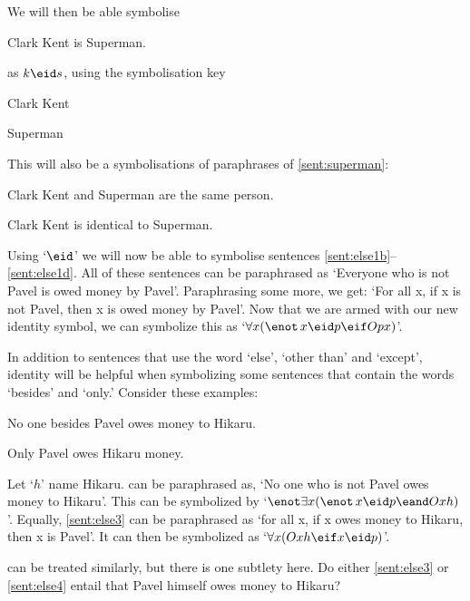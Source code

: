 We will then be able symbolise
\begin{samplesent}
\item\label{sent:superman} Clark Kent is Superman.
\end{samplesent}
as $k\eid s$, using the symbolisation key
\begin{ekey}
\item[k] Clark Kent
\item[s] Superman
\end{ekey}
This will also be a symbolisations of paraphrases of \cref{sent:superman}:
\begin{samplesent}
\item\label{sent:superman1b} Clark Kent and Superman are the same person.
\item\label{sent:superman1c} Clark Kent is identical to Superman.
\end{samplesent}

Using `$\eid $' we will now be able to symbolise sentences \cref{sent:else1b}--\ref{sent:else1d}. All of these sentences can be  paraphrased as `Everyone who is not Pavel is owed money by Pavel'. Paraphrasing some more, we get: `For all x, if x is not Pavel, then x is owed money by Pavel'. Now that we are armed with our new identity symbol, we can symbolize this as `$\forall x (\enot\, x\eid p \eif Opx)$'.

In addition to sentences that use the word `else', `other than' and `except', identity will be helpful when symbolizing some sentences that contain the words `besides' and `only.' Consider these examples:

\begin{samplesent}
\item\label{sent:else3} No one besides Pavel owes money to Hikaru.
\item\label{sent:else4} Only Pavel owes Hikaru money.
\end{samplesent}
Let `$h$' name Hikaru.  can be paraphrased as, `No one who is not Pavel owes money to Hikaru'. This can be symbolized by `$\enot\exists x(\enot\,x \eid p \eand Oxh)$'. Equally, \cref{sent:else3} can be paraphrased as `for all x, if x owes money to Hikaru, then x is Pavel'. It can then be symbolized as `$\forall x (Oxh \eif x \eid p)$'.

 can be treated similarly, but there is one subtlety here. Do either \cref{sent:else3} or \ref{sent:else4} entail that Pavel himself owes money to Hikaru?



